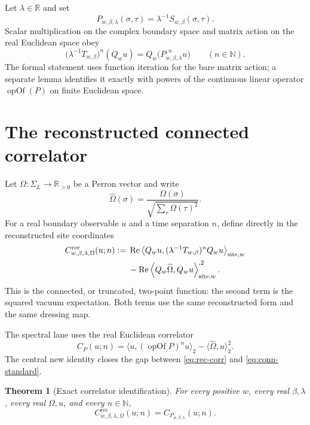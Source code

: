 \documentclass[11pt]{article}
\newtheorem{theorem}{Theorem}[section]
\newcommand{\R}{\mathbb R}
\newcommand{\N}{\mathbb N}
\newcommand{\SigmaL}{\Sigma_L}
\begin{document}
Let $\lambda\in\R$ and set
\begin{equation}\label{eq:tilt-v2}
 P_{w,\beta,\lambda}(\sigma,\tau)
 =\lambda^{-1}S_{w,\beta}(\sigma,\tau).
\end{equation}
Scalar multiplication on the complex boundary space and matrix action on the
real Euclidean space obey
\begin{equation}\label{eq:tilt-iterate-v2}
 \bigl(\lambda^{-1}T_{w,\beta}\bigr)^n(Q_wu)
 =Q_w\bigl(P_{w,\beta,\lambda}^{,n}u\bigr)
 \qquad(n\in\N).
\end{equation}
The formal statement uses function iteration for the bare matrix action; a
separate lemma identifies it exactly with powers of the continuous linear
operator $\operatorname{opOf}(P)$ on finite Euclidean space.

\section{The reconstructed connected correlator}

Let $\Omega:\SigmaL\to\R_{>0}$ be a Perron vector and write
\begin{equation}\label{eq:vac-v2}
 \widehat\Omega(\sigma)
 =\frac{\Omega(\sigma)}
 {\sqrt{\sum_\tau\Omega(\tau)^2}}.
\end{equation}
For a real boundary observable $u$ and a time separation $n$, define directly
in the reconstructed site coordinates
\begin{align}
 C^{\mathrm{rec}}_{w,\beta,\lambda,\Omega}(u;n)
  :={}&\operatorname{Re}\left\langle Q_wu,
      (\lambda^{-1}T_{w,\beta})^n Q_wu
       \right\rangle_{\mathrm{site},w}\notag\\
 &-\operatorname{Re}\left\langle Q_w\widehat\Omega,
       Q_wu\right\rangle_{\mathrm{site},w}^{,2}.
 \label{eq:rec-corr}
\end{align}
This is the connected, or truncated, two-point function: the second term is
the squared vacuum expectation.  Both terms use the same reconstructed form
and the same dressing map.

The spectral lane uses the real Euclidean correlator
\begin{equation}\label{eq:conn-standard}
 C_P(u;n)=\langle u,(\operatorname{opOf}P)^n u\rangle_2
   -\langle\widehat\Omega,u\rangle_2^2.
\end{equation}
The central new identity closes the gap between \eqref{eq:rec-corr} and
\eqref{eq:conn-standard}.

\begin{theorem}[Exact correlator identification]\label{thm:corr-id}
For every positive $w$, every real $\beta,\lambda$, every real $\Omega,u$, and
every $n\in\N$,
\begin{equation}\label{eq:corr-id}
 C^{\mathrm{rec}}_{w,\beta,\lambda,\Omega}(u;n)
 =C_{P_{w,\beta,\lambda}}(u;n).
\end{equation}
\end{theorem}
\end{document}
